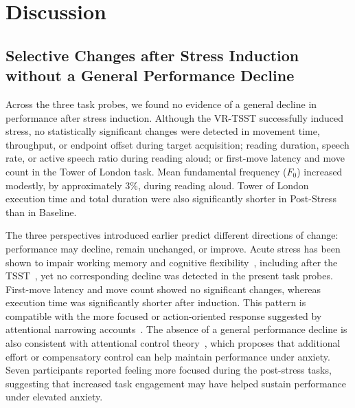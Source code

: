 
\section{Discussion}
\subsection{Selective Changes after Stress Induction without a General Performance Decline}
\label{sec:discussion-dynamics}


Across the three task probes, we found no evidence of a general decline in performance after stress induction. Although the VR-TSST successfully induced stress, no statistically significant changes were detected in movement time, throughput, or endpoint offset during target acquisition; reading duration, speech rate, or active speech ratio during reading aloud; or first-move latency and move count in the Tower of London task. Mean fundamental frequency (\(F_0\)) increased modestly, by approximately 3\%, during reading aloud. Tower of London execution time and total duration were also significantly shorter in Post-Stress than in Baseline.


The three perspectives introduced earlier predict different directions of change: performance may decline, remain unchanged, or improve. Acute stress has been shown to impair working memory and cognitive flexibility~\citep{shields2016effects}, including after the TSST~\citep{luethi2009stress,alexander2007beta}, yet no corresponding decline was detected in the present task probes. First-move latency and move count showed no significant changes, whereas execution time was significantly shorter after induction. This pattern is compatible with the more focused or action-oriented response suggested by attentional narrowing accounts~\citep{easterbrook1959effect,plessow2011inflexibly}. The absence of a general performance decline is also consistent with attentional control theory~\citep{eysenck2007anxiety}, which proposes that additional effort or compensatory control can help maintain performance under anxiety. Seven participants reported feeling more focused during the post-stress tasks, suggesting that increased task engagement may have helped sustain performance under elevated anxiety.

